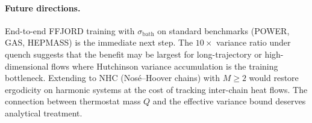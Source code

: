 \documentclass[11pt]{article}
\newcommand{\sbath}{\sigma_{\mathrm{bath}}}
\begin{document}
\paragraph{Future directions.}
End-to-end FFJORD training with $\sbath$ on standard benchmarks (POWER, GAS,
HEPMASS) is the immediate next step. The $10\times$ variance ratio under quench
suggests that the benefit may be largest for long-trajectory or
high-dimensional flows where Hutchinson variance accumulation is the training
bottleneck. Extending to NHC (Nos\'{e}--Hoover chains) with $M \geq 2$ would
restore ergodicity on harmonic systems at the cost of tracking inter-chain
heat flows. The connection between thermostat mass $Q$ and the effective
variance bound deserves analytical treatment.


\end{document}
